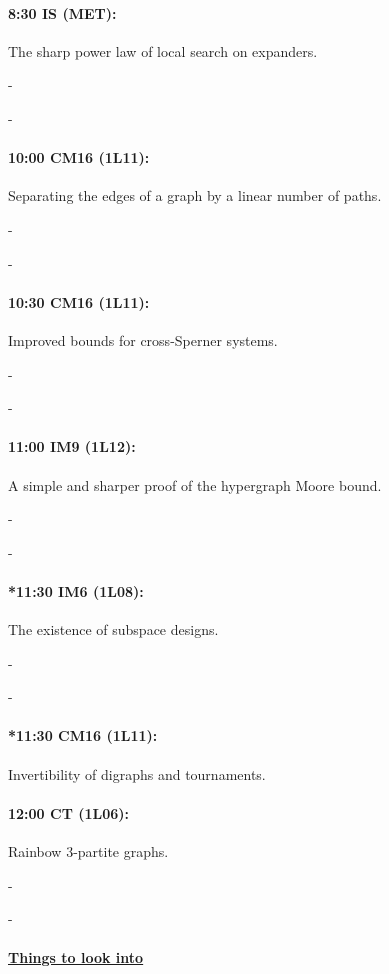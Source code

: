 \documentclass[12]{article}
\theoremstyle{definition}
\begin{document}
	\paragraph{8:30 IS (MET):} The sharp power law of local search on expanders.
	
	-
	
	-
	
	\paragraph{10:00 CM16 (1L11):} Separating the edges of a graph by a linear number of paths.
	
	-
	
	-
	
	\paragraph{10:30 CM16 (1L11):} Improved bounds for cross-Sperner systems.
	
	-
	
	-
	
	\paragraph{11:00 IM9 (1L12):} A simple and sharper proof of the hypergraph Moore bound.
	
	-
	
	-
	
	\paragraph{*11:30 IM6 (1L08):} The existence of subspace designs.
	
	-
	
	-
	
	\paragraph{*11:30 CM16 (1L11):} Invertibility of digraphs and tournaments.
	
	\paragraph{12:00 CT (1L06):} Rainbow 3-partite graphs.
	
	-
	
	-
	
	\begin{center} 
		\item\paragraph{\underline{Things to look into}} 
	\end{center}
\end{document}
